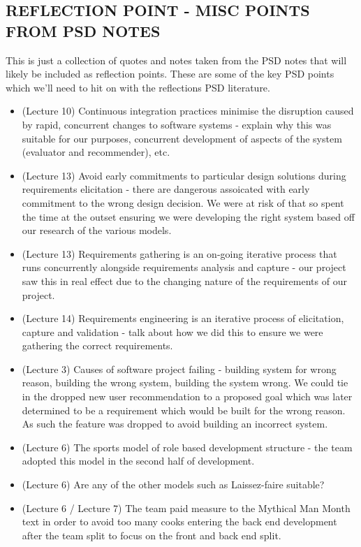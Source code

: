 \documentclass{l3proj}
\begin{document}
\subsection{REFLECTION POINT - MISC POINTS FROM PSD NOTES}
\label{sec:miscpsd}
This is just a collection of quotes and notes taken from the PSD notes that will likely be included as reflection points. These are some of the key PSD points which we'll need to hit on with the reflections PSD literature.
\begin{itemize}
\item (Lecture 10) Continuous integration practices minimise the disruption caused by rapid, concurrent changes to software systems - explain why this was suitable for our purposes, concurrent development of aspects of the system (evaluator and recommender), etc.
\item (Lecture 13) Avoid early commitments to particular design solutions during requirements elicitation - there are dangerous assoicated with early commitment to the wrong design decision. We were at risk of that so spent the time at the outset ensuring we were developing the right system based off our research of the various models.
\item (Lecture 13) Requirements gathering is an on-going iterative process that runs concurrently alongside requirements analysis and capture - our project saw this in real effect due to the changing nature of the requirements of our project.
\item (Lecture 14) Requirements engineering is an iterative process of elicitation, capture and validation - talk about how we did this to ensure we were gathering the correct requirements.
\item (Lecture 3) Causes of software project failing - building system for wrong reason, building the wrong system, building the system wrong. We could tie in the dropped new user recommendation to a proposed goal which was later determined to be a requirement which would be built for the wrong reason. As such the feature was dropped to avoid building an incorrect system.
\item (Lecture 6) The sports model of role based development structure - the team adopted this model in the second half of development.
\item (Lecture 6) Are any of the other models such as Laissez-faire suitable?
\item (Lecture 6 / Lecture 7) The team paid measure to the Mythical Man Month text in order to avoid too many cooks entering the back end development after the team split to focus on the front and back end split.

\end{itemize}
\end{document}
